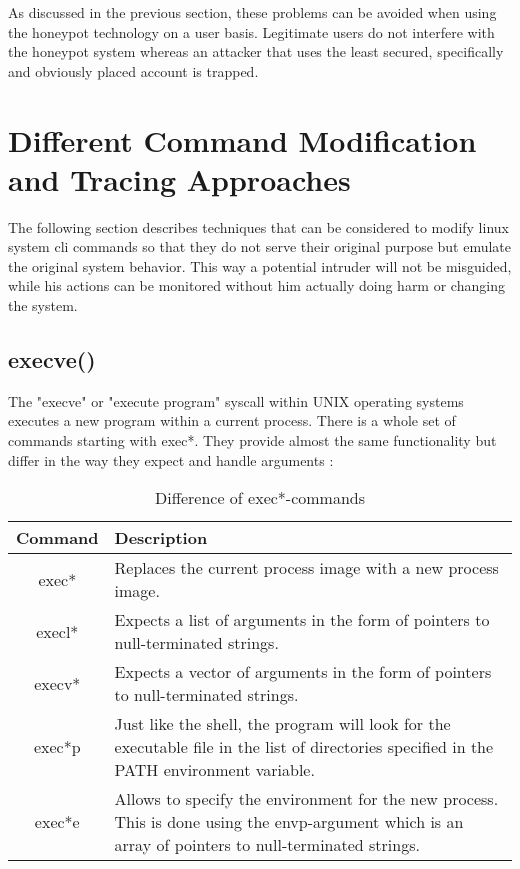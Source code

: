 As discussed in the previous section, these problems can be avoided when using the honeypot technology on a user basis. Legitimate users do not interfere with the honeypot system whereas an attacker that uses the least secured, specifically and obviously placed account is trapped.

\section{Different Command Modification and Tracing Approaches} 
The following section describes techniques that can be considered to modify linux system cli commands so that they do not serve their original purpose but emulate the original system behavior. This way a potential intruder will not be misguided, while his actions can be monitored without him actually doing harm or changing the system. 

\subsection{execve()}
The "execve" or "execute program" syscall within UNIX operating systems executes a new program within a current process. There is a whole set of commands starting with exec*. They provide almost the same functionality but differ in the way they expect and handle arguments \cite{execve}:

\begin{table}[H]
    \centering
    \begin{tabular}{c | l}
        Command & Description \\
        \midrule
        exec* & \parbox{12cm}{Replaces the current process image with a new process image.}\\
        \midrule
        execl* & \parbox{12cm}{Expects a list of arguments in the form of pointers to null-terminated strings.}\\
        \midrule
        execv* & \parbox{12cm}{Expects a vector of arguments in the form of pointers to null-terminated strings.}\\
        \midrule
        exec*p & \parbox{12cm}{Just like the shell, the program will look for the executable file in the list of directories specified in the PATH environment variable.}\\
        \midrule
        exec*e & \parbox{12cm}{Allows to specify the environment for the new process. This is done using the envp-argument which is an array of pointers to null-terminated strings.}\\
    \end{tabular}
    \caption{Difference of exec*-commands}
    \label{tab:my_label}
\end{table}

